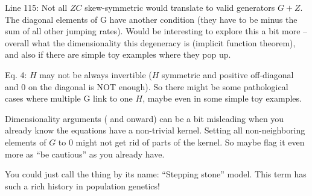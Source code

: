 \begin{point}{Line 115:}
    Not all $ZC$ skew-symmetric would translate to valid generators 
    $G + Z$. The diagonal elements of G have another condition (they have to be minus
    the sum of all other jumping rates). Would be interesting to explore this a
    bit more -- overall what the dimensionality this degeneracy is (implicit
    function theorem), and also if there are simple toy examples where they pop
    up.
\end{point}


\begin{point}{Eq. 4:}
    $H$ may not be always invertible ($H$ symmetric and positive off-diagonal
    and 0 on the diagonal is NOT enough). So there might be some pathological
    cases where multiple G link to one $H$, maybe even in some simple toy
    examples.
\end{point}


\begin{point}{}
    Dimensionality arguments (\revref{} and onward) can be a bit misleading when you
    already know the equations have a non-trivial kernel. Setting all
    non-neighboring elements of $G$ to 0 might not get rid of parts of the
    kernel. So maybe flag it even more as ``be cautious'' as you already have.
\end{point}


\begin{point}{}
    You could just call the thing by its name: ``Stepping stone'' model. This
    term has such a rich history in population genetics!
\end{point}


